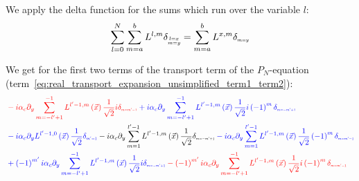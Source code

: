 \documentclass[10pt]{scrartcl}
\begin{document}
We apply the delta function for the sums which run over the variable $l$:
\begin{align}
\sum_{l=0}^{N}\sum_{m=a}^{b}L^{l,m}\delta_{\scaleto{\substack{l=x\\m=y}}{9pt}}=\sum_{m=a}^{b}L^{x,m}\delta_{\scaleto{m=y}{3pt}}
\end{align}

We get for the first two terms of the transport term of the $P_N$-equation (term~\ref{eq:real_transport_expansion_unsimplified_term1_term2}):
\begin{align*}
&
\mathcolor{red}{-i}
\mathcolor{red}{\alpha_c\partial_y
\sum_{m=-l'+1}^{-1}L^{l'-1,m}\left (\vec{x}\right)
\frac{1}{\sqrt{2}}
i\delta_{\scaleto{m=m'-1}{4pt}}
}
\mathcolor{blue}{
+i
}
\mathcolor{blue}{
\alpha_c\partial_y
\sum_{m=-l'+1}^{-1}L^{l'-1,m}\left (\vec{x}\right)
\frac{1}{\sqrt{2}}
i
\left({-1}\right)^{m}
\delta_{\scaleto{m=-m'+1}{4pt}}
}
\\&
\mathcolor{blue}
{
-i
}
\mathcolor{blue}
{
\alpha_c\partial_y
L^{l'-1,0}\left (\vec{x}\right)
\frac{1}{\sqrt{2}}
\delta_{\scaleto{m'=1}{4pt}}
}
\mathcolor{black}
{
-i
}
\mathcolor{black}
{
\alpha_c\partial_y
\sum_{m=1}^{l'-1}L^{l'-1,m}\left (\vec{x}\right)
\frac{1}{\sqrt{2}}
\delta_{\scaleto{m=-m'+1}{4pt}}
}
\mathcolor{blue}
{
-i
}
\mathcolor{blue}
{
\alpha_c\partial_y
\sum_{m=1}^{l'-1}L^{l'-1,m}\left (\vec{x}\right)
\frac{1}{\sqrt{2}}
\left({-1}\right)^{m}
\delta_{\scaleto{m=m'-1}{4pt}}
}
\\&
\mathcolor{blue}
{
+\left({-1}\right)^{m'}i
}
\mathcolor{blue}{
\alpha_c\partial_y
\sum_{m=-l'+1}^{-1}L^{l'-1,m}\left (\vec{x}\right)
\frac{1}{\sqrt{2}}
i
\delta_{\scaleto{m=-m'+1}{4pt}}
}
\mathcolor{red}
{
-\left({-1}\right)^{m'}i
}
\mathcolor{red}
{
\alpha_c\partial_y
\sum_{m=-l'+1}^{-1}L^{l'-1,m}\left (\vec{x}\right)
\frac{1}{\sqrt{2}}
i
\left({-1}\right)^{m}
\delta_{\scaleto{m=m'-1}{4pt}}
}

\end{align*}
\end{document}
